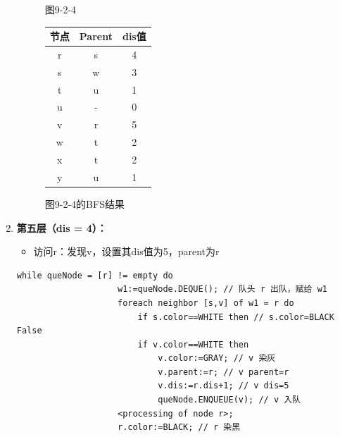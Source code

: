 \documentclass{article}
\begin{document}
\begin{enumerate}
\begin{figure}[htbp]
\begin{minipage}[b]{0.6\textwidth}
                \caption{图9-2-4}
                \label{fig:9-2-4}
        \end{minipage}%
        \hfill%
        \begin{minipage}[b]{0.4\textwidth}    %
            \centering
                \begin{tabular}{|c|c|c|}
                    \hline
                    节点 & Parent & dis值 \\
                    \hline
                    r & s & 4 \\
                    s & w & 3 \\
                    t & u & 1 \\
                    u & - & 0 \\
                    v & r & 5 \\
                    w & t & 2 \\
                    x & t & 2 \\
                    y & u & 1 \\
                    \hline
                \end{tabular}
                \caption{图9-2-4的BFS结果}
                \label{tab:graph9-2-4-bfs}
        \end{minipage}
    \end{figure}
    
    \pagebreak 
    \item \textbf{第五层（dis = 4）：}
    \begin{itemize}
        \item 访问r：发现v，设置其dis值为5，parent为r
    \end{itemize}

    \begin{lstlisting}[style=algorithmPPT]
                while queNode = [r] != empty do 
                    w1:=queNode.DEQUE(); // 队头 r 出队，赋给 w1
                    foreach neighbor [s,v] of w1 = r do
                        if s.color==WHITE then // s.color=BLACK False
                        if v.color==WHITE then 
                            v.color:=GRAY; // v 染灰
                            v.parent:=r; // v parent=r
                            v.dis:=r.dis+1; // v dis=5
                            queNode.ENQUEUE(v); // v 入队
                    <processing of node r>;
                    r.color:=BLACK; // r 染黑
        \end{lstlisting}    


\end{enumerate}
\end{document}
